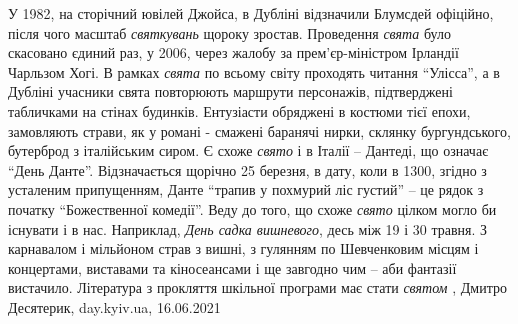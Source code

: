 У 1982, на сторічний ювілей Джойса, в Дубліні відзначили Блумсдей офіційно,
після чого масштаб \emph{святкувань} щороку зростав. Проведення \emph{свята} було скасовано
єдиний раз, у 2006, через жалобу за прем'єр-міністром Ірландії Чарльзом Хогі.
В рамках \emph{свята} по всьому світу проходять читання \enquote{Улісса}, а в Дубліні учасники
свята повторюють маршрути персонажів, підтверджені табличками на стінах
будинків. Ентузіасти обряджені в костюми тієї епохи, замовляють страви, як у
романі - смажені баранячі нирки, склянку бургундського, бутерброд з італійським
сиром.  Є схоже \emph{свято} і в Італії – Дантеді, що означає \enquote{День Данте}.
Відзначається щорічно 25 березня, в дату, коли в 1300, згідно з усталеним
припущенням, Данте \enquote{трапив у похмурий ліс густий} – це рядок з початку
\enquote{Божественної комедії}.  Веду до того, що схоже \emph{свято} цілком могло би існувати
і в нас. Наприклад, \emph{День садка вишневого}, десь між 19 і 30 травня. З карнавалом
і мільйоном страв з вишні, з гулянням по Шевченковим місцям і концертами,
виставами та кіносеансами і ще завгодно чим – аби фантазії вистачило.
Література з прокляття шкільної програми має стати \emph{святом}
, 
Дмитро Десятерик, day.kyiv.ua, 16.06.2021

